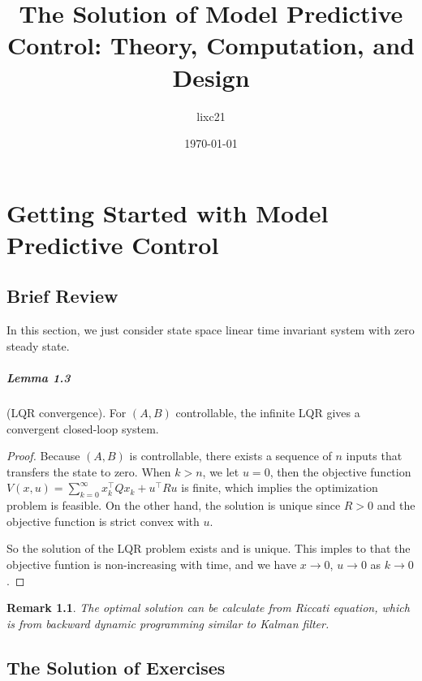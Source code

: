 \documentclass[11pt,a4paper]{report}
\title{The Solution of Model Predictive Control: Theory, Computation, and Design}
\author{lixc21}
\date{\today}
\newtheorem*{remark}{Remark}
\begin{document}
\maketitle

\chapter{Getting Started with Model Predictive Control}
\section{Brief Review}
In this section, we just consider state space linear time invariant system with zero steady state.

\paragraph{Lemma 1.3} (LQR convergence). For $(A,B)$ controllable, the infinite LQR gives a convergent closed-loop system.
\begin{proof}
Because $(A,B)$ is controllable, there exists a sequence of $n$ inputs that transfers the state to zero. When $k>n$, we let $u=0$, then the objective function $V(x,u)=\sum_{k=0}^\infty x_k^\top Qx_k+u^\top Ru$ is finite, which implies the optimization problem is feasible. On the other hand, the solution is unique since $R>0$ and the objective function is strict convex with $u$.

So the solution of the LQR problem exists and is unique. This imples to that the objective funtion is non-increasing with time, and we have $x\to 0$, $u\to 0$ as $k\to 0$.
\end{proof}
\begin{remark}
The optimal solution can be calculate from Riccati equation, which is from backward dynamic programming similar to Kalman filter.
\end{remark}

\section{The Solution of Exercises}
\end{document}
